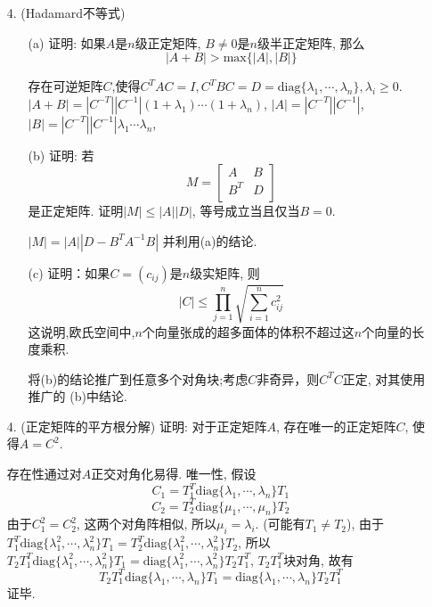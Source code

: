 \begin{itemize}
	\item[4.](Hadamard不等式) 
	\begin{itemize}
		\item [(a)] 证明: 如果$A$是$n$级正定矩阵, $B \ne 0$是$n$级半正定矩阵, 那么
		\begin{equation}
		\nonumber
		|A+B| > \mathrm{max}\{|A|, |B|\}
		\end{equation}
		\begin{solution}
			存在可逆矩阵$C$,使得$C^TAC=I, C^TBC = D = 
			\mathrm{diag}\{\lambda_1,\cdots, \lambda_n\}, \lambda_i \ge 0$.
			$|A+B| = |C^{-T}||C^{-1}|(1+\lambda_1)\cdots(1+\lambda_n)$,
			$|A| = |C^{-T}||C^{-1}|$,
			$|B| = |C^{-T}||C^{-1}|\lambda_1 \cdots \lambda_n$,
		\end{solution}
		\vspace{1cm}

		\item[(b)] 证明: 若
		\begin{equation}
		\nonumber
		M = \begin{bmatrix}
			A& B\\
			B^T& D\\
		\end{bmatrix}
		\end{equation}
		是正定矩阵. 证明$|M| \le |A||D|$, 等号成立当且仅当$B = 0$.
		\begin{solution}
			$|M| = |A||D-B^TA^{-1}B|$ 并利用(a)的结论.
		\end{solution}
		\vspace{2cm}

		\item[(c)] 
		证明：如果$C=(c_{ij})$是$n$级实矩阵, 则
		$$|C| \le \prod_{j=1}^n \sqrt{\sum_{i=1}^n c_{ij}^2}$$
		这说明,欧氏空间中,$n$个向量张成的超多面体的体积不超过这$n$个向量的长度乘积.
		\begin{solution}
			将(b)的结论推广到任意多个对角块;考虑$C$非奇异，则$C^TC$正定, 对其使用推广的
			(b)中结论.
		\end{solution}
		\vspace{2cm}
	\end{itemize}

	\item[4.] (正定矩阵的平方根分解) 证明: 对于正定矩阵$A$, 存在唯一的正定矩阵$C$, 使得$A = C^2$.
	\begin{solution}
		存在性通过对$A$正交对角化易得.
		唯一性, 假设
		$$C_1 = T_1^T \mathrm{diag}\{\lambda_1, \cdots, \lambda_n\} T_1$$
		$$C_2 = T_2^T \mathrm{diag}\{\mu_1, \cdots, \mu_n\} T_2$$
		由于$C_1^2 = C_2^2$, 这两个对角阵相似, 所以$\mu_i = \lambda_i$.
		({\color{red}可能有$T_1 \ne T_2$}),
		由于
		$
		T_1^T \mathrm{diag}\{\lambda_1^2, \cdots, \lambda_n^2\} T_1 = 
		T_2^T \mathrm{diag}\{\lambda_1^2, \cdots, \lambda_n^2\} T_2
		$,
		所以
		$
		T_2 T_1^T \mathrm{diag}\{\lambda_1^2, \cdots, \lambda_n^2\} T_1 = 
		\mathrm{diag}\{\lambda_1^2, \cdots, \lambda_n^2\} T_2 T_1^T
		$,
		$T_2 T_1^T$块对角, 故有
		$$
		T_2 T_1^T \mathrm{diag}\{\lambda_1, \cdots, \lambda_n\} T_1 = 
		\mathrm{diag}\{\lambda_1, \cdots, \lambda_n\} T_2 T_1^T
		$$
		证毕.



\end{solution}
\end{itemize}
